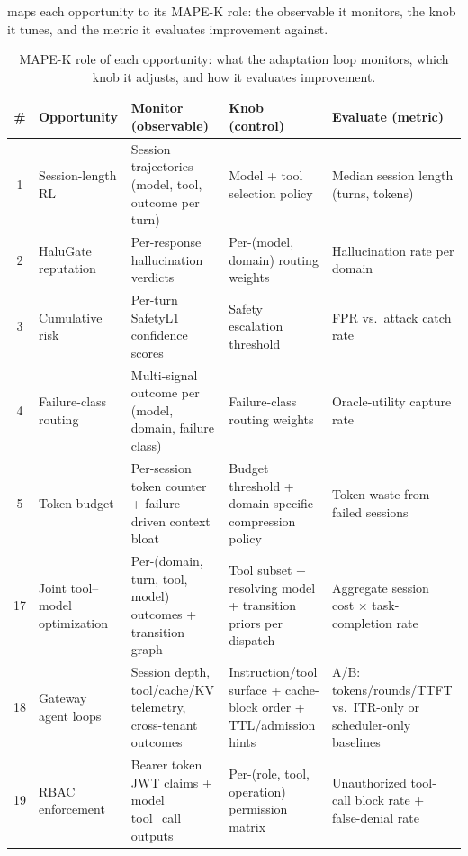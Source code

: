 \begin{opportunity}
 maps each opportunity to its MAPE-K role: the
observable it monitors, the knob it tunes, and the metric it
evaluates improvement against.

\begin{table}[t]
\centering
\caption{MAPE-K role of each opportunity: what the adaptation loop
monitors, which knob it adjusts, and how it evaluates improvement.}
\label{tab:mape}
\scriptsize
\renewcommand{\arraystretch}{1.10}
\begin{tabularx}{\textwidth}{c l X X X}
\toprule
\textbf{\#} & \textbf{Opportunity} & \textbf{Monitor (observable)}
  & \textbf{Knob (control)} & \textbf{Evaluate (metric)} \\
\midrule
\rowcolor{routergreen!6}
1  & Session-length RL
   & Session trajectories (model, tool, outcome per turn)
   & Model + tool selection policy
   & Median session length (turns, tokens) \\
2  & HaluGate reputation
   & Per-response hallucination verdicts
   & Per-(model, domain) routing weights
   & Hallucination rate per domain \\
\rowcolor{routergreen!6}
3  & Cumulative risk
   & Per-turn SafetyL1 confidence scores
   & Safety escalation threshold
   & FPR vs.\ attack catch rate \\
4  & Failure-class routing
   & Multi-signal outcome per (model, domain, failure class)
   & Failure-class routing weights
   & Oracle-utility capture rate \\
\rowcolor{routergreen!6}
5  & Token budget
   & Per-session token counter + failure-driven context bloat
   & Budget threshold + domain-specific compression policy
   & Token waste from failed sessions \\
\rowcolor{routergreen!6}
17 & Joint tool--model optimization
   & Per-(domain, turn, tool, model) outcomes + transition graph
   & Tool subset + resolving model + transition priors per dispatch
   & Aggregate session cost $\times$ task-completion rate \\
\rowcolor{routergreen!6}
18 & Gateway agent loops
   & Session depth, tool/cache/KV telemetry, cross-tenant outcomes
   & Instruction/tool surface + cache-block order + TTL/admission hints
   & A/B: tokens/rounds/TTFT vs.\ ITR-only or scheduler-only baselines \\
19 & RBAC enforcement
   & Bearer token JWT claims + model tool\_call outputs
   & Per-(role, tool, operation) permission matrix
   & Unauthorized tool-call block rate + false-denial rate \\

\end{tabularx}
\end{table}
\end{opportunity}
